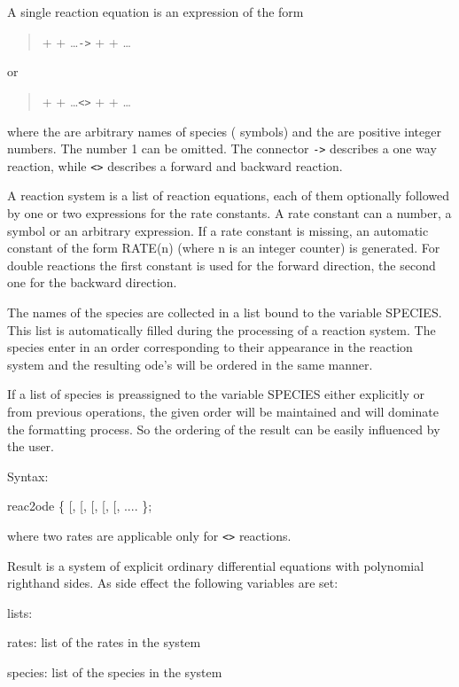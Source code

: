
A single reaction equation is an expression of the form
\begin{quote}
  +  + \ldots \texttt{->}  +  + \ldots
\end{quote}
 or
\begin{quote}  +  + \ldots \texttt{<>}  +  + \ldots
\end{quote}
where the  are arbitrary names of species (\REDUCE{} symbols)
and the  are positive integer numbers. The number 1
can be omitted. The connector \texttt{->} describes a one way reaction,
while \texttt{<>} describes a forward and backward reaction.

A reaction system is a list of reaction equations, each of them
optionally followed by one or two expressions for the rate
constants. A rate constant can a number, a symbol or an 
arbitrary \REDUCE{} expression. If a rate constant is missing,
an automatic constant of the form RATE(n) (where n is an
integer counter) is generated. For double reactions the
first constant is used for the forward direction, the second
one for the backward direction.

The names of the species are collected in a list bound to
the \REDUCE{} variable SPECIES. This list is automatically filled
during the processing of a reaction system. The species enter
in an order corresponding to their appearance in the reaction
system and the resulting ode's will be ordered in the same manner.

If a list of species is preassigned to the variable
SPECIES either explicitly or from previous operations, the 
given order will be maintained and will dominate the formatting
process. So the ordering of the result can be easily influenced
by the user.

Syntax:

 reac2ode \{  {[}, {[},\meta{rate}{]}{]} 
 {[}, {[}, {[},\meta{rate}{]}{]}{]} 
 .... 
 \};

where two rates are applicable only for \texttt{<>} reactions.

Result is a system of explicit ordinary differential
 equations with polynomial righthand sides. As side
 effect the following variables are set:

 lists:

 rates: list of the rates in the system

 species: list of the species in the system

